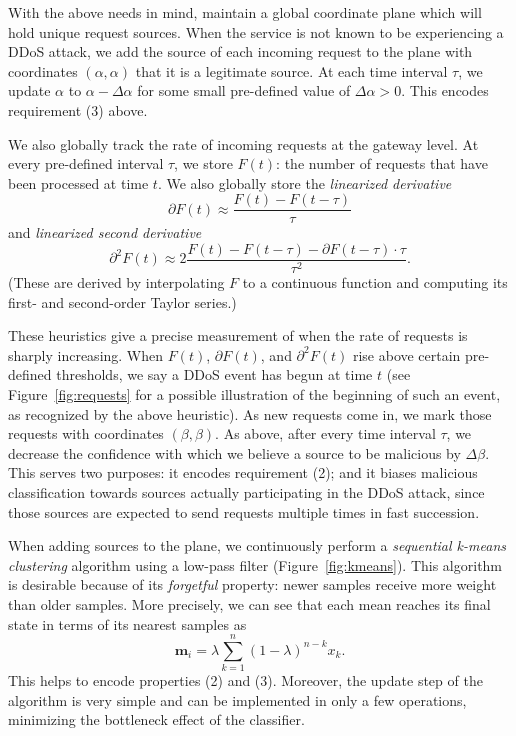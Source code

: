 \documentclass[twocolumn]{article}
\begin{document}
With the above needs in mind, maintain a global coordinate plane which will hold unique request sources. When the service is not known to be experiencing a DDoS attack, we add the source of each incoming request to the plane with coordinates $(\alpha,\alpha)$ that it is a legitimate source. At each time interval $\tau$, we update $\alpha$ to $\alpha-\Delta\alpha$ for some small pre-defined value of $\Delta\alpha>0$. This encodes requirement (3) above.

We also globally track the rate of incoming requests at the gateway level. At every pre-defined interval $\tau$, we store $F(t)$: the number of requests that have been processed at time $t$. We also globally store the \emph{linearized derivative}
\begin{equation}\partial F(t)\approx \frac{F(t)-F(t-\tau)}{\tau}\end{equation}
and \emph{linearized second derivative}
\begin{equation}\partial^2 F(t)\approx 2\frac{F(t)-F(t-\tau)-\partial F(t-\tau)\cdot \tau}{\tau^2}.\end{equation}
(These are derived by interpolating $F$ to a continuous function and computing its first- and second-order Taylor series.)

These heuristics give a precise measurement of when the rate of requests is sharply increasing. When $F(t)$, $\partial F(t)$, and $\partial^2 F(t)$ rise above certain pre-defined thresholds, we say a DDoS event has begun at time $t$ (see Figure~\ref{fig:requests} for a possible illustration of the beginning of such an event, as recognized by the above heuristic). As new requests come in, we mark those requests with coordinates $(\beta,\beta)$. As above, after every time interval $\tau$, we decrease the confidence with which we believe a source to be malicious by $\Delta\beta$. This serves two purposes: it encodes requirement (2); and it biases malicious classification towards sources actually participating in the DDoS attack, since those sources are expected to send requests multiple times in fast succession.

When adding sources to the plane, we continuously perform a \emph{sequential k-means clustering} algorithm using a low-pass filter (Figure~\ref{fig:kmeans}). This algorithm is desirable because of its \emph{forgetful} property: newer samples receive more weight than older samples. More precisely, we can see that each mean reaches its final state in terms of its nearest samples as
\begin{equation}\mathbf{m}_i=\lambda\sum_{k=1}^n (1-\lambda)^{n-k} x_k.\end{equation}
This helps to encode properties (2) and (3). Moreover, the update step of the algorithm is very simple and can be implemented in only a few operations, minimizing the bottleneck effect of the classifier.
\end{document}
